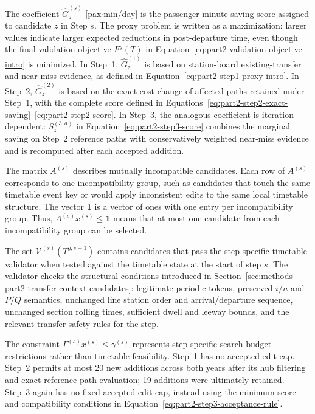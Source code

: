 \documentclass[preprint,12pt]{elsarticle}
\begin{document}
The coefficient \(\widehat G^{(s)}_z\) [pax\(\cdot\)min/day] is the passenger-minute saving score assigned to candidate \(z\) in Step \(s\). The proxy problem is written as a maximization: larger values indicate larger expected reductions in post-departure time, even though the final validation objective \(F^y(T)\) in Equation~\eqref{eq:part2-validation-objective-intro} is minimized. In Step~1, \(\widehat G^{(1)}_z\) is based on station-board existing-transfer and near-miss evidence, as defined in Equation~\eqref{eq:part2-step1-proxy-intro}. In Step~2, \(\widehat G^{(2)}_z\) is based on the exact cost change of affected paths retained under Step~1, with the complete score defined in Equations~\eqref{eq:part2-step2-exact-saving}--\eqref{eq:part2-step2-score}. In Step~3, the analogous coefficient is iteration-dependent: \(S_z^{(3,a)}\) in Equation~\eqref{eq:part2-step3-score} combines the marginal saving on Step~2 reference paths with conservatively weighted near-miss evidence and is recomputed after each accepted addition.

The matrix \(A^{(s)}\) describes mutually incompatible candidates. Each row of \(A^{(s)}\) corresponds to one incompatibility group, such as candidates that touch the same timetable event key or would apply inconsistent edits to the same local timetable structure. The vector \(\mathbf{1}\) is a vector of ones with one entry per incompatibility group. Thus, \(A^{(s)}x^{(s)}\le\mathbf{1}\) means that at most one candidate from each incompatibility group can be selected.

The set \(\mathcal{V}^{(s)}(T^{y,s-1})\) contains candidates that pass the step-specific timetable validator when tested against the timetable state at the start of step \(s\). The validator checks the structural conditions introduced in Section~\ref{sec:methods-part2-transfer-context-candidates}: legitimate periodic tokens, preserved \(i/n\) and \(P/Q\) semantics, unchanged line station order and arrival/departure sequence, unchanged section rolling times, sufficient dwell and leeway bounds, and the relevant transfer-safety rules for the step. 

The constraint \(\Gamma^{(s)}x^{(s)}\le\gamma^{(s)}\) represents step-specific search-budget restrictions rather than timetable feasibility. Step~1 has no accepted-edit cap. Step~2 permits at most 20 new additions across both years after its hub filtering and exact reference-path evaluation; 19 additions were ultimately retained. Step~3 again has no fixed accepted-edit cap, instead using the minimum score and compatibility conditions in Equation~\eqref{eq:part2-step3-acceptance-rule}.
\end{document}
